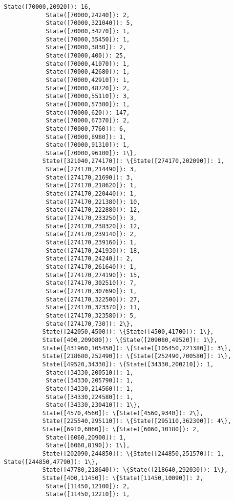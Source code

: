 \documentclass[11pt]{article}
\begin{document}
\begin{Verbatim}[commandchars=\\\{\}]
            State([70000,20920]): 16,
            State([70000,24240]): 2,
            State([70000,321040]): 5,
            State([70000,34270]): 1,
            State([70000,35450]): 1,
            State([70000,3830]): 2,
            State([70000,400]): 25,
            State([70000,41070]): 1,
            State([70000,42680]): 1,
            State([70000,42910]): 1,
            State([70000,48720]): 2,
            State([70000,55110]): 3,
            State([70000,57300]): 1,
            State([70000,620]): 147,
            State([70000,67370]): 2,
            State([70000,7760]): 6,
            State([70000,8980]): 1,
            State([70000,91310]): 1,
            State([70000,96100]): 1\},
           State([321040,274170]): \{State([274170,202090]): 1,
            State([274170,214490]): 3,
            State([274170,21690]): 3,
            State([274170,218620]): 1,
            State([274170,220440]): 1,
            State([274170,221380]): 10,
            State([274170,222880]): 12,
            State([274170,233250]): 3,
            State([274170,238320]): 12,
            State([274170,239140]): 2,
            State([274170,239160]): 1,
            State([274170,241930]): 18,
            State([274170,24240]): 2,
            State([274170,261640]): 1,
            State([274170,274190]): 15,
            State([274170,302510]): 7,
            State([274170,307690]): 1,
            State([274170,322500]): 27,
            State([274170,323370]): 11,
            State([274170,323580]): 5,
            State([274170,730]): 2\},
           State([242050,4500]): \{State([4500,41700]): 1\},
           State([400,209080]): \{State([209080,49520]): 1\},
           State([431960,105450]): \{State([105450,221380]): 3\},
           State([218680,252490]): \{State([252490,700580]): 1\},
           State([49520,34330]): \{State([34330,200210]): 1,
            State([34330,200510]): 1,
            State([34330,205790]): 1,
            State([34330,214560]): 1,
            State([34330,224580]): 1,
            State([34330,230410]): 1\},
           State([4570,4560]): \{State([4560,9340]): 2\},
           State([225540,295110]): \{State([295110,362300]): 4\},
           State([6910,6060]): \{State([6060,10180]): 2,
            State([6060,20900]): 1,
            State([6060,8190]): 1\},
           State([202090,244850]): \{State([244850,251570]): 1, State([244850,47790]): 1\},
           State([47780,218640]): \{State([218640,292030]): 1\},
           State([400,11450]): \{State([11450,10090]): 2,
            State([11450,12100]): 2,
            State([11450,12210]): 1,

\end{Verbatim}
\end{document}
